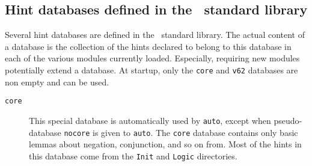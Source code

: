 \begin{coq_example*}




\subsection{Hint databases defined in the \Coq\ standard library}

Several hint databases are defined in the \Coq\ standard library.  The
actual content of a database is the collection of the hints declared
to belong to this database in each of the various modules currently
loaded.  Especially, requiring new modules potentially extend a
database. At {\Coq} startup, only the {\tt core} and {\tt v62}
databases are non empty and can be used.

\begin{description}

\item[\tt core] This special database is automatically used by
  \texttt{auto}, except when pseudo-database \texttt{nocore} is
  given to \texttt{auto}. The \texttt{core} database contains
  only basic lemmas about negation,
  conjunction, and so on from. Most of the hints in this database come
  from the \texttt{Init} and \texttt{Logic} directories.


\end{description}
\end{coq_example*}
